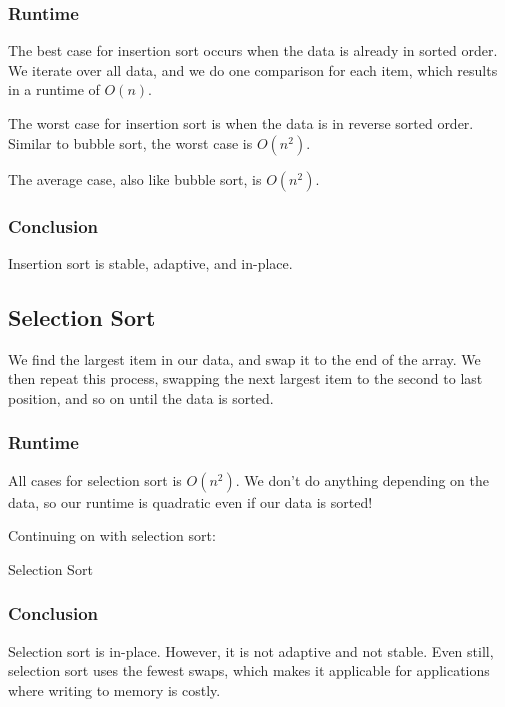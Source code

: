 \documentclass[a4paper]{article}
\begin{document}
\subsubsection{Runtime}
The best case for insertion sort occurs when the data is already in sorted order. We iterate over all data, and we do one comparison for each item, which results in a runtime of \( O(n) \).

The worst case for insertion sort is when the data is in reverse sorted order. Similar to bubble sort, the worst case is \( O(n^2) \).

The average case, also like bubble sort, is \( O(n^2) \).

\subsubsection{Conclusion}
Insertion sort is stable, adaptive, and in-place.

\subsection{Selection Sort}
We find the largest item in our data, and swap it to the end of the array. We then repeat this process, swapping the next largest item to the second to last position, and so on until the data is sorted.

\subsubsection{Runtime}
All cases for selection sort is \( O(n^2) \). We don't do anything depending on the data, so our runtime is quadratic even if our data is sorted!


Continuing on with selection sort:

\begin{algorithm}[H]
	\caption{Selection Sort}
\end{algorithm}

\subsubsection{Conclusion}

Selection sort is in-place. However, it is not adaptive and not stable. Even still, selection sort uses the fewest swaps, which makes it applicable for applications where writing to memory is costly.
\end{document}
